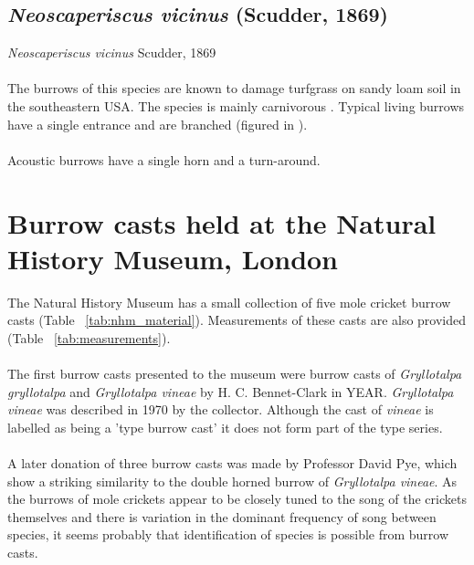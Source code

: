 \documentclass{article}
\begin{document}
   \subsection{\textit{Neoscaperiscus vicinus} (Scudder, 1869) \cite{scudder1869}}
   \textit{Neoscaperiscus vicinus} Scudder, 1869
   \paragraph{}
   The burrows of this species are known to damage turfgrass on sandy loam soil in the southeastern USA. The species is mainly carnivorous \cite{brandenburg2002}. Typical living burrows have a single entrance and are branched (figured in \cite{brandenburg2002}).
   \paragraph{}
   Acoustic burrows have a single horn and a turn-around.
   
   \section{Burrow casts held at the Natural History Museum, London}
   The Natural History Museum has a small collection of five mole cricket burrow casts (Table ~\ref{tab:nhm_material}). Measurements of these casts are also provided (Table ~\ref{tab:measurements}).
   
   \paragraph{}
   The first burrow casts presented to the museum were burrow casts of \textit{Gryllotalpa gryllotalpa} and \textit{Gryllotalpa vineae} by H. C. Bennet-Clark in YEAR. \textit{Gryllotalpa vineae} was described in 1970 \cite{bennetclark1970b} by the collector. Although the cast of \textit{vineae} is labelled as being a 'type burrow cast' it does not form part of the type series.
   
   \paragraph{}
   A later donation of three burrow casts was made by Professor David Pye, which show a striking similarity to the double horned burrow of \textit{Gryllotalpa vineae}. As the burrows of mole crickets appear to be closely tuned to the song of the crickets themselves \cite{bennetclark1987,daws1996} and there is variation in the dominant frequency of song between species, it seems probably that identification of species is possible from burrow casts.
   
\end{document}
